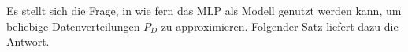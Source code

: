 Es stellt sich die Frage, in wie fern das MLP als Modell genutzt werden kann, um beliebige Datenverteilungen $P_D$ zu approximieren. Folgender Satz liefert dazu die Antwort.

\begin{satz}
    
\end{satz}